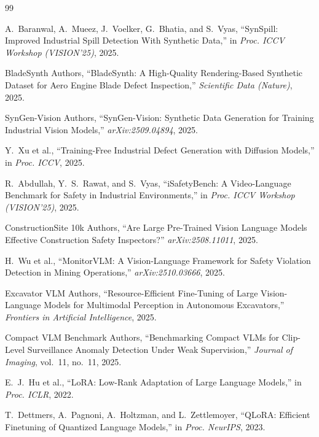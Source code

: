 \documentclass[12pt, a4paper]{article}
\begin{document}
\begin{thebibliography}{99}

A.~Baranwal, A.~Mueez, J.~Voelker, G.~Bhatia, and S.~Vyas, ``SynSpill: Improved Industrial Spill Detection With Synthetic Data,'' in \textit{Proc. ICCV Workshop (VISION'25)}, 2025.

BladeSynth Authors, ``BladeSynth: A High-Quality Rendering-Based Synthetic Dataset for Aero Engine Blade Defect Inspection,'' \textit{Scientific Data (Nature)}, 2025.

SynGen-Vision Authors, ``SynGen-Vision: Synthetic Data Generation for Training Industrial Vision Models,'' \textit{arXiv:2509.04894}, 2025.

Y.~Xu et al., ``Training-Free Industrial Defect Generation with Diffusion Models,'' in \textit{Proc. ICCV}, 2025.

R.~Abdullah, Y.~S.~Rawat, and S.~Vyas, ``iSafetyBench: A Video-Language Benchmark for Safety in Industrial Environments,'' in \textit{Proc. ICCV Workshop (VISION'25)}, 2025.

ConstructionSite 10k Authors, ``Are Large Pre-Trained Vision Language Models Effective Construction Safety Inspectors?'' \textit{arXiv:2508.11011}, 2025.

H.~Wu et al., ``MonitorVLM: A Vision-Language Framework for Safety Violation Detection in Mining Operations,'' \textit{arXiv:2510.03666}, 2025.

Excavator VLM Authors, ``Resource-Efficient Fine-Tuning of Large Vision-Language Models for Multimodal Perception in Autonomous Excavators,'' \textit{Frontiers in Artificial Intelligence}, 2025.

Compact VLM Benchmark Authors, ``Benchmarking Compact VLMs for Clip-Level Surveillance Anomaly Detection Under Weak Supervision,'' \textit{Journal of Imaging}, vol.~11, no.~11, 2025.

E.~J.~Hu et al., ``LoRA: Low-Rank Adaptation of Large Language Models,'' in \textit{Proc. ICLR}, 2022.

T.~Dettmers, A.~Pagnoni, A.~Holtzman, and L.~Zettlemoyer, ``QLoRA: Efficient Finetuning of Quantized Language Models,'' in \textit{Proc. NeurIPS}, 2023.


\end{thebibliography}
\end{document}
